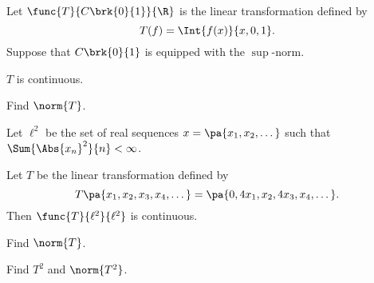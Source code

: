 \documentclass[12pt,letterpaper,twoside]{hmcpset}
\begin{document}
\begin{problem}[7][10]
 Let $\func{T}{C\brk{0}{1}}{\R}$ is the linear transformation defined by
 \[T(f) = \Int{f(x)}{x,0,1}.\]
 Suppose that $C\brk{0}{1}$ is equipped with the $\sup$-norm.
\end{problem}

\begin{problem}[7a]
 $T$ is continuous.
\end{problem}

\begin{problem}[7b]
 Find $\norm{T}$.
\end{problem}

\begin{problem}[8][15]
 Let $\ell^2$ be the set of real sequences $x = \pa{x_1,x_2,\dotsc}$ such that $\Sum{\Abs{x_n}^2}{n} < \infty$.
\end{problem}

\begin{problem}[8a]
 Let $T$ be the linear transformation defined by \[T\pa{x_1,x_2,x_3,x_4,\dotsc} = \pa{0,4x_1,x_2,4x_3,x_4,\dotsc}.\] Then $\func{T}{\ell^2}{\ell^2}$ is continuous.
\end{problem}

\begin{problem}[8b]
 Find $\norm{T}$.
\end{problem}

\begin{problem}
 Find $T^2$ and $\norm{T^2}$.
\end{problem}
\end{document}
